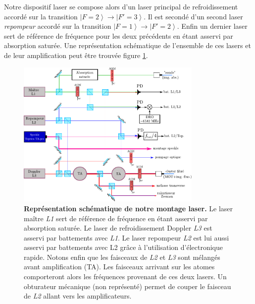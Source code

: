Notre dispositif laser se compose alors d'un laser principal de refroidissement accordé sur la transition $\left| F=2 \right\rangle \rightarrow \left| F'=3 \right\rangle$. Il est secondé d'un second laser \emph{repompeur} accordé sur la transition $\left| F=1 \right\rangle \rightarrow \left| F'=2 \right\rangle$. Enfin un dernier laser sert de référence de fréquence pour les deux précédents en étant asservi par absorption saturée. Une représentation schématique de l'ensemble de ces lasers et de leur amplification peut être trouvée figure \ref{fig:table_optique}.

\begin{figure}
\centering
\includegraphics[width=0.8\textwidth]{Fig/BEC_manip/table_optique2.pdf}
\caption{\textbf{Représentation schématique de notre montage laser.} Le laser maître \emph{L1} sert de référence de fréquence en étant asservi par absorption saturée. Le laser de refroidissement Doppler \emph{L3} est asservi par battements avec \emph{L1}. Le laser repompeur \emph{L2} est lui aussi asservi par battements avec L2 grâce à l'utilisation d'électronique rapide. Notons enfin que les faisceaux de \emph{L2} et \emph{L3} sont mélangés avant amplification (TA). Les faisceaux arrivant sur les atomes comporteront alors les fréquences provenant de ces deux lasers. Un obturateur mécanique (non représenté) permet de couper le faisceau de \emph{L2} allant vers les amplificateurs.}
\label{fig:table_optique}
\end{figure}

